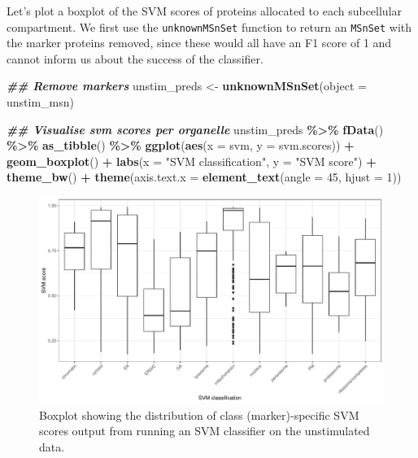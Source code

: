 \documentclass[9pt,a4paper,]{extarticle}
\newenvironment{Shaded}{\begin{snugshade}}{\end{snugshade}}
\newcommand{\AttributeTok}[1]{\textcolor[rgb]{0.13,0.29,0.53}{#1}}
\newcommand{\DecValTok}[1]{\textcolor[rgb]{0.00,0.00,0.81}{#1}}
\newcommand{\DocumentationTok}[1]{\textcolor[rgb]{0.56,0.35,0.01}{\textbf{\textit{#1}}}}
\newcommand{\FunctionTok}[1]{\textcolor[rgb]{0.13,0.29,0.53}{\textbf{#1}}}
\newcommand{\NormalTok}[1]{#1}
\newcommand{\OtherTok}[1]{\textcolor[rgb]{0.56,0.35,0.01}{#1}}
\newcommand{\SpecialCharTok}[1]{\textcolor[rgb]{0.81,0.36,0.00}{\textbf{#1}}}
\newcommand{\StringTok}[1]{\textcolor[rgb]{0.31,0.60,0.02}{#1}}
\begin{document}
Let's plot a boxplot of the SVM scores of proteins allocated to each subcellular
compartment. We first use the \texttt{unknownMSnSet} function to return an \texttt{MSnSet} with
the marker proteins removed, since these would all have an F1 score of 1 and
cannot inform us about the success of the classifier.

\begin{Shaded}
\begin{Highlighting}[]
\DocumentationTok{\#\# Remove markers}
\NormalTok{unstim\_preds }\OtherTok{\textless{}{-}} \FunctionTok{unknownMSnSet}\NormalTok{(}\AttributeTok{object =}\NormalTok{ unstim\_msn)}

\DocumentationTok{\#\# Visualise svm scores per organelle}
\NormalTok{unstim\_preds }\SpecialCharTok{\%\textgreater{}\%}
  \FunctionTok{fData}\NormalTok{() }\SpecialCharTok{\%\textgreater{}\%} 
  \FunctionTok{as\_tibble}\NormalTok{() }\SpecialCharTok{\%\textgreater{}\%}
  \FunctionTok{ggplot}\NormalTok{(}\FunctionTok{aes}\NormalTok{(}\AttributeTok{x =}\NormalTok{ svm, }\AttributeTok{y =}\NormalTok{ svm.scores)) }\SpecialCharTok{+}
  \FunctionTok{geom\_boxplot}\NormalTok{() }\SpecialCharTok{+}
  \FunctionTok{labs}\NormalTok{(}\AttributeTok{x =} \StringTok{"SVM classification"}\NormalTok{, }\AttributeTok{y =} \StringTok{"SVM score"}\NormalTok{) }\SpecialCharTok{+}
  \FunctionTok{theme\_bw}\NormalTok{() }\SpecialCharTok{+} 
  \FunctionTok{theme}\NormalTok{(}\AttributeTok{axis.text.x =} \FunctionTok{element\_text}\NormalTok{(}\AttributeTok{angle =} \DecValTok{45}\NormalTok{, }\AttributeTok{hjust =} \DecValTok{1}\NormalTok{))}
\end{Highlighting}
\end{Shaded}

\begin{figure}[H]

{\centering \includegraphics[width=0.6\linewidth,]{figs/svm_score_boxplot} 

}

\caption{Boxplot showing the distribution of class (marker)-specific SVM scores output from running an SVM classifier on the unstimulated data.}\label{fig:svm-boxplot}
\end{figure}
\end{document}
